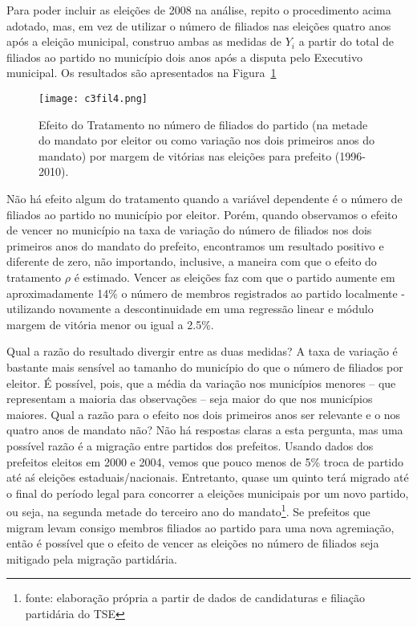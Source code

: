 Para poder incluir as eleições de 2008 na análise, repito o procedimento acima adotado, mas, em vez de utilizar o número de filiados nas eleições quatro anos após a eleição municipal, construo ambas as medidas de $Y_{i}$ a partir do total de filiados ao partido no município dois anos após a disputa pelo Executivo municipal. Os resultados são apresentados na Figura~\ref{fig:c3fil4}

\begin{figure}[htp]
	\centering
	\texttt{[image: c3fil4.png]}
	\caption{Efeito do Tratamento no número de filiados do partido (na metade do mandato por eleitor ou como variação nos dois primeiros anos do mandato) por margem de vitórias nas eleições para prefeito (1996-2010).}
	\label{fig:c3fil4}
\end{figure}

Não há efeito algum do tratamento quando a variável dependente é o número de filiados ao partido no município por eleitor. Porém, quando observamos o efeito de vencer no município na taxa de variação do número de filiados nos dois primeiros anos do mandato do prefeito, encontramos um resultado positivo e diferente de zero, não importando, inclusive, a maneira com que o efeito do tratamento $\rho$ é estimado. Vencer as eleições faz com que o partido aumente em aproximadamente 14\% o número de membros registrados ao partido localmente - utilizando novamente a descontinuidade em uma regressão linear e módulo margem de vitória menor ou igual a 2.5\%.

Qual a razão do resultado divergir entre as duas medidas? A taxa de variação é bastante mais sensível ao tamanho do município do que o número de filiados por eleitor. É possível, pois, que a média da variação nos municípios menores -- que representam a maioria das observações -- seja maior do que nos municípios maiores. Qual a razão para o efeito nos dois primeiros anos ser relevante e o nos quatro anos de mandato não? Não há respostas claras a esta pergunta, mas uma possível razão é a migração entre partidos dos prefeitos. Usando dados dos prefeitos eleitos em 2000 e 2004, vemos que pouco menos de 5\% troca de partido até aś eleições estaduais/nacionais. Entretanto, quase um quinto terá migrado até o final do período legal para concorrer a eleições municipais por um novo partido, ou seja, na segunda metade do terceiro ano do mandato\footnote{fonte: elaboração própria a partir de dados de candidaturas e filiação partidária do TSE}. Se prefeitos que migram levam consigo membros filiados ao partido para uma nova agremiação, então é possível que o efeito de vencer as eleições no número de filiados seja mitigado pela migração partidária.

